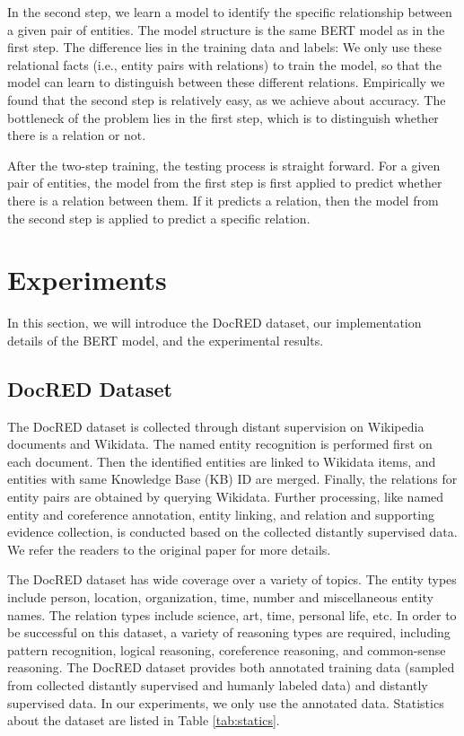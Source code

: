 \documentclass[11pt,a4paper]{article}
\begin{document}
In the second step, we learn a model to identify the specific relationship between a given pair of entities. The model structure is the same BERT model as in the first step. The difference lies in the training data and labels: We only use these relational facts (i.e., entity pairs with relations) to train the model, so that the model can learn to distinguish between these different relations. Empirically we found that the second step is relatively easy, as we achieve about  accuracy. The bottleneck of the problem lies in the first step, which is to distinguish whether there is a relation or not.

After the two-step training, the testing process is straight forward. For a given pair of entities, the model from the first step is first applied to predict whether there is a relation between them. If it predicts a relation, then the model from the second step is applied to predict a specific relation.

\section{Experiments}
In this section, we will introduce the DocRED dataset, our implementation details of the BERT model, and the experimental results.

\subsection{DocRED Dataset}
The DocRED dataset is collected through distant supervision \cite{DistantSupervision} on Wikipedia documents and Wikidata. The named entity recognition is performed first on each document. Then the identified entities are linked to Wikidata items, and entities with same Knowledge Base (KB) ID are merged. Finally, the relations for entity pairs are obtained by querying Wikidata. Further processing, like named entity and coreference annotation, entity linking, and relation and supporting evidence collection, is conducted based on the collected distantly supervised data. We refer the readers to the original paper \cite{yao2019DocRED} for more details.

The DocRED dataset has wide coverage over a variety of topics. The entity types include person, location, organization, time, number and miscellaneous entity names. The relation types include science, art, time, personal life, etc. In order to be successful on this dataset, a variety of reasoning types are required, including pattern recognition, logical reasoning, coreference reasoning, and common-sense reasoning. The DocRED dataset provides both annotated training data (sampled from collected distantly supervised and humanly labeled data) and distantly supervised data. In our experiments, we only use the annotated data. Statistics about the dataset are listed in Table \ref{tab:statics}.
\end{document}
